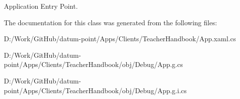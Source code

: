 Application Entry Point. 



The documentation for this class was generated from the following files\+:\begin{DoxyCompactItemize}
\item 
D\+:/\+Work/\+Git\+Hub/datum-\/point/\+Apps/\+Clients/\+Teacher\+Handbook/App.\+xaml.\+cs\item 
D\+:/\+Work/\+Git\+Hub/datum-\/point/\+Apps/\+Clients/\+Teacher\+Handbook/obj/\+Debug/App.\+g.\+cs\item 
D\+:/\+Work/\+Git\+Hub/datum-\/point/\+Apps/\+Clients/\+Teacher\+Handbook/obj/\+Debug/App.\+g.\+i.\+cs\end{DoxyCompactItemize}
